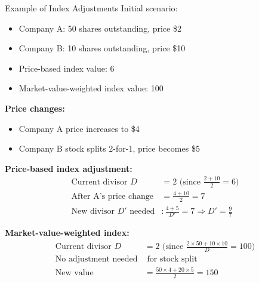 \documentclass[10pt]{beamer}
\begin{document}
\begin{frame}{Example of Index Adjustments}
  Initial scenario:
  \begin{itemize}
    \item Company A: 50 shares outstanding, price \$2
    \item Company B: 10 shares outstanding, price \$10
    \item Price-based index value: 6
    \item Market-value-weighted index value: 100
  \end{itemize}
  
  \pause
  \textbf{Price changes:}
  \begin{itemize}
    \item Company A price increases to \$4
    \item Company B stock splits 2-for-1, price becomes \$5
  \end{itemize}
  
  \pause
  \textbf{Price-based index adjustment:}
  \begin{align*}
    \text{Current divisor } D &= 2 \text{ (since } \tfrac{2 + 10}{2} = 6)\\
    \text{After A's price change} &= \tfrac{4 + 10}{2} = 7\\
    \text{New divisor } D' \text{ needed} &: \tfrac{4 + 5}{D'} = 7 \Rightarrow D' = \tfrac{9}{7}
  \end{align*}
  
  \pause
  \textbf{Market-value-weighted index:}
  \begin{align*}
    \text{Current divisor } D &= 2 \text{ (since } \tfrac{2 \times 50 + 10 \times 10}{D} = 100)\\
    \text{No adjustment needed} &\text{ for stock split}\\
    \text{New value} &= \tfrac{50 \times 4 + 20 \times 5}{2} = 150
  \end{align*}
\end{frame}
\end{document}
